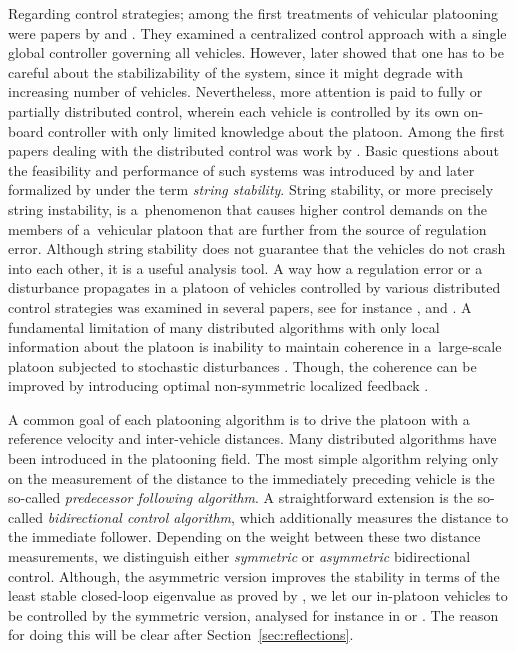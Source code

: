 \documentclass[final,5p,times,twocolumn]{elsarticle}
\begin{document}
Regarding control strategies; among the first treatments of vehicular platooning were papers by \cite{Levine1966} and \cite{Melzer1971}. They examined a centralized control approach with a single global controller governing all vehicles. However, \cite{Jovanovic2005a} later showed that one has to be careful about the stabilizability of the system, since it might degrade with increasing number of vehicles. Nevertheless, more attention is paid to fully or partially distributed control, wherein each vehicle is controlled by its own on-board controller with only limited knowledge about the platoon. Among the first papers dealing with the distributed control was work by \cite{chu_decentralized_1974}. Basic questions about the feasibility and performance of such systems was introduced by \cite{Cosgriff1969} and later formalized by \cite{Swaroop1996} under the term \emph{string stability}. String stability, or more precisely string instability, is a~phenomenon that causes higher control demands on the members of a~vehicular platoon that are further from the source of regulation error. Although string stability does not guarantee that the vehicles do not crash into each other, it is a useful analysis tool. A way how a regulation error or a disturbance propagates in a platoon of vehicles controlled by various distributed control strategies was examined in several papers, see for instance \cite{Seiler2004a}, \cite{Barooah2005a} and \cite{Shaw2007}. A fundamental limitation of many distributed algorithms with only local information about the platoon is inability to maintain coherence in a~large-scale platoon subjected to stochastic disturbances \cite{Bamieh2012b}. Though, the coherence can be improved by introducing optimal non-symmetric localized feedback \cite{Lin2011}.

A common goal of each platooning algorithm is to drive the platoon with a reference velocity and inter-vehicle distances. Many distributed algorithms have been introduced in the platooning field. The most simple algorithm relying only on the measurement of the distance to the immediately preceding vehicle is the so-called \emph{predecessor following algorithm}. A straightforward extension is the so-called \emph{bidirectional control algorithm}, which additionally measures the distance to the immediate follower. Depending on the weight between these two distance measurements, we distinguish either \emph{symmetric} or \emph{asymmetric} bidirectional control. Although, the asymmetric version improves the stability in terms of the least stable closed-loop eigenvalue as proved by \cite{Barooah2009}, we let our in-platoon vehicles to be controlled by the symmetric version, analysed for instance in \cite{Lestas2007} or \cite{Middleton2010}. The reason for doing this will be clear after Section~\ref{sec:reflections}.
\end{document}
